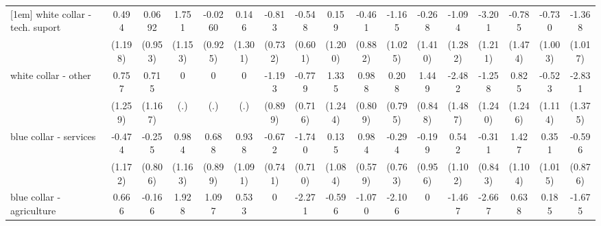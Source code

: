 {\begin{tabular}{l*{16}{c}}
[1em]
white collar - tech. suport&       0.494         &      0.0692         &       1.751         &     -0.0260         &       0.146         &      -0.813         &      -0.548         &       0.159         &      -0.461         &      -1.165         &      -0.268         &      -1.094         &      -3.201\sym{**} &      -0.785         &      -0.730         &      -1.368         \\
                    &     (1.198)         &     (0.953)         &     (1.153)         &     (0.925)         &     (1.301)         &     (0.732)         &     (0.601)         &     (1.200)         &     (0.882)         &     (1.025)         &     (1.410)         &     (1.282)         &     (1.211)         &     (1.474)         &     (1.003)         &     (1.017)         \\
[1em]
white collar - other&       0.757         &       0.715         &           0         &           0         &           0         &      -1.193         &      -0.779         &       1.335         &       0.988         &       0.208         &       1.449         &      -2.482         &      -1.258         &       0.825         &      -0.523         &      -2.831\sym{*}  \\
                    &     (1.259)         &     (1.167)         &         (.)         &         (.)         &         (.)         &     (0.899)         &     (0.716)         &     (1.244)         &     (0.809)         &     (0.795)         &     (0.848)         &     (1.487)         &     (1.240)         &     (1.246)         &     (1.114)         &     (1.375)         \\
[1em]
blue collar - services&      -0.474         &      -0.255         &       0.984         &       0.688         &       0.938         &      -0.672         &      -1.740\sym{*}  &       0.135         &       0.984         &      -0.294         &      -0.199         &       0.542         &      -0.311         &       1.427         &       0.351         &      -0.596         \\
                    &     (1.172)         &     (0.806)         &     (1.163)         &     (0.899)         &     (1.091)         &     (0.741)         &     (0.710)         &     (1.084)         &     (0.579)         &     (0.763)         &     (0.956)         &     (1.102)         &     (0.843)         &     (1.104)         &     (1.015)         &     (0.876)         \\
[1em]
blue collar - agriculture&       0.666         &      -0.166         &       1.928         &       1.097         &       0.533         &           0         &      -2.271\sym{*}  &      -0.596         &      -1.070         &      -2.106         &           0         &      -1.467         &      -2.667\sym{*}  &       0.638         &       0.185         &      -1.675         \\

\end{tabular}}
